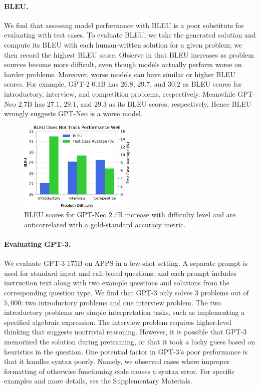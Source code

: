 \paragraph{BLEU.} We find that assessing model performance with BLEU is a poor substitute for evaluating with test cases. To evaluate BLEU, we take the generated solution and compute its BLEU with each human-written solution for a given problem; we then record the highest BLEU score. Observe in  that BLEU increases as problem sources become more difficult, even though models actually perform worse on harder problems. Moreover, worse models can have similar or higher BLEU scores. For example, GPT-2 0.1B has $26.8$, $29.7$, and $30.2$ as BLEU scores for introductory, interview, and competition problems, respectively. Meanwhile GPT-Neo 2.7B has $27.1$, $29.1$, and $29.3$ as its BLEU scores, respectively. Hence BLEU wrongly suggests GPT-Neo is a worse model. 











\begin{figure}
    \centering
    \includegraphics[width=0.5\textwidth]{figures/bleu.pdf}
    \caption{BLEU scores for GPT-Neo 2.7B increase with difficulty level and are anticorrelated with a gold-standard accuracy metric.}
    \label{fig:bleu}
\end{figure}

\paragraph{Evaluating GPT-3.}
We evaluate GPT-3 175B on APPS in a few-shot setting. A separate prompt is used for standard input and call-based questions, and each prompt includes instruction text along with two example questions and solutions from the corresponding question type. We find that GPT-3 only solves $3$ problems out of $5,\!000$: two introductory problems and one interview problem. The two introductory problems are simple interpretation tasks, such as implementing a specified algebraic expression. The interview problem requires higher-level thinking that suggests nontrivial reasoning. However, it is possible that GPT-3 memorized the solution during pretraining, or that it took a lucky guess based on heuristics in the question. One potential factor in GPT-3's poor performance is that it handles syntax poorly. Namely, we observed cases where improper formatting of otherwise functioning code causes a syntax error. For specific examples and more details, see the Supplementary Materials.

